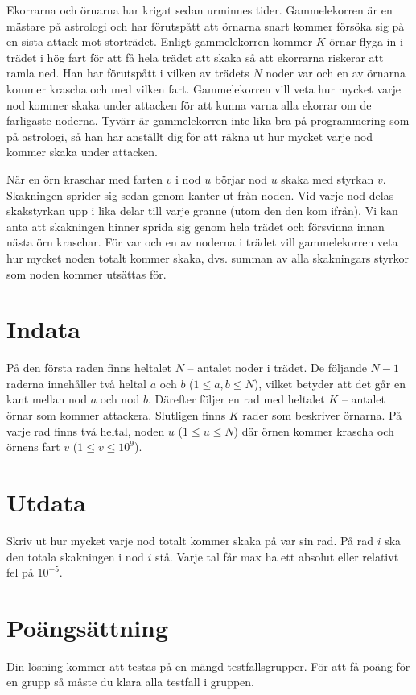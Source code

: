 Ekorrarna och örnarna har krigat sedan urminnes tider. Gammelekorren är en mästare på astrologi och har förutspått att örnarna snart kommer försöka sig på en sista attack mot storträdet.
Enligt gammelekorren kommer $K$ örnar flyga in i trädet i hög fart för att få hela trädet att skaka så att ekorrarna riskerar att ramla ned.
Han har förutspått i vilken av trädets $N$ noder var och en av örnarna kommer krascha och med vilken fart.
Gammelekorren vill veta hur mycket varje nod kommer skaka under attacken för att kunna varna alla ekorrar om de farligaste noderna.
Tyvärr är gammelekorren inte lika bra på programmering som på astrologi, så han har anställt dig för att räkna ut hur mycket varje nod kommer skaka under attacken.

När en örn kraschar med farten $v$ i nod $u$ börjar nod $u$ skaka med styrkan $v$. Skakningen sprider sig sedan genom kanter ut från noden. Vid varje nod delas skakstyrkan upp i lika delar till varje granne (utom den den kom ifrån). 
Vi kan anta att skakningen hinner sprida sig genom hela trädet och försvinna innan nästa örn kraschar. För var och en av noderna i trädet vill gammelekorren veta hur mycket
noden totalt kommer skaka, dvs. summan av alla skakningars styrkor som noden kommer utsättas för.

\section*{Indata}
På den första raden finns heltalet $N$ -- antalet noder i trädet.
De följande $N-1$ raderna innehåller två heltal $a$ och $b$ ($1 \le a,b \le N$), vilket betyder att det går en kant mellan nod $a$ och nod $b$.
Därefter följer en rad med heltalet $K$ -- antalet örnar som kommer attackera.
Slutligen finns $K$ rader som beskriver örnarna. På varje rad finns två heltal, noden $u$ ($1 \le u \le N$) där örnen kommer krascha och örnens fart $v$ ($1 \le v \le 10^9$).

\section*{Utdata}
Skriv ut hur mycket varje nod totalt kommer skaka på var sin rad. På rad $i$ ska den totala skakningen i nod $i$ stå. Varje tal får max ha ett absolut eller relativt fel på $10^{-5}$.

\section*{Poängsättning}
Din lösning kommer att testas på en mängd testfallsgrupper.
För att få poäng för en grupp så måste du klara alla testfall i gruppen.

